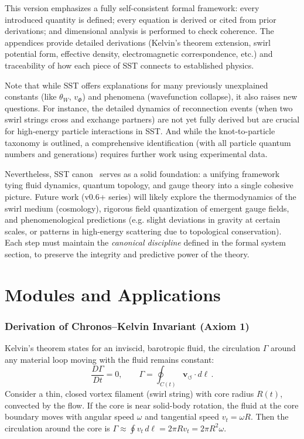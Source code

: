 \documentclass[10pt,reprint,aps,onecolumn,nofootinbib]{revtex4-2}
\newcommand{\vswirl}{\mathbf{v}_{\!\boldsymbol{\circlearrowleft}}}
\begin{document}
This version emphasizes a fully self-consistent formal framework: every introduced quantity is defined; every equation is derived or cited from prior derivations; and dimensional analysis is performed to check coherence. The appendices provide detailed derivations (Kelvin’s theorem extension, swirl potential form, effective density, electromagnetic correspondence, etc.) and traceability of how each piece of SST connects to established physics.

Note that while SST offers explanations for many previously unexplained constants (like $\theta_W$, $v_{\Phi}$) and phenomena (wavefunction collapse), it also raises new questions. For instance, the detailed dynamics of reconnection events (when two swirl strings cross and exchange partners) are not yet fully derived but are crucial for high-energy particle interactions in SST. And while the knot-to-particle taxonomy is outlined, a comprehensive identification (with all particle quantum numbers and generations) requires further work using experimental data.

Nevertheless, SST canon \canonversion \ serves as a solid foundation: a unifying framework tying fluid dynamics, quantum topology, and gauge theory into a single cohesive picture. Future work (v0.6+ series) will likely explore the thermodynamics of the swirl medium (cosmology), rigorous field quantization of emergent gauge fields, and phenomenological predictions (e.g. slight deviations in gravity at certain scales, or patterns in high-energy scattering due to topological conservation). Each step must maintain the \emph{canonical discipline} defined in the formal system section, to preserve the integrity and predictive power of the theory.

\newpage
\appendix


\part{Modules and Applications}
    \section{Derivation of Chronos–Kelvin Invariant (Axiom 1)}
        Kelvin’s theorem states for an inviscid, barotropic fluid, the circulation $\Gamma$ around any material loop moving with the fluid remains constant:
        \[
            \frac{D\Gamma}{Dt} = 0, \qquad \Gamma = \oint_{C(t)} \vswirl \cdot d\ell\,.
        \]
        Consider a thin, closed vortex filament (swirl string) with core radius $R(t)$, convected by the flow. If the core is near solid-body rotation, the fluid at the core boundary moves with angular speed $\omega$ and tangential speed $v_t = \omega R$. Then the circulation around the core is $\Gamma \approx \oint v_t\,d\ell = 2\pi R v_t = 2\pi R^2 \omega$.
\end{document}
